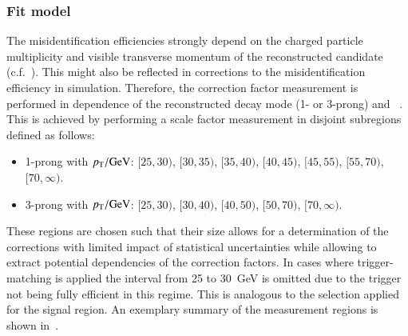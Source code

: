 


\subsubsection{Fit model}

The \jettotauhadvis misidentification efficiencies strongly depend on
the charged particle multiplicity and visible transverse momentum of
the reconstructed \tauhadvis candidate (c.f.\ ). This
might also be reflected in corrections to the \jettotauhadvis
misidentification efficiency in simulation. Therefore, the correction
factor measurement is performed in dependence of the reconstructed
decay mode (1- or 3-prong) and \tauhadvis~\pT. This is achieved by
performing a scale factor measurement in disjoint subregions defined
as follows:
\begin{itemize}

\item 1-prong \tauhadvis with $\pT / \si{\GeV}$: $[25, 30)$, $[30, 35)$,
  $[35, 40)$, $[40, 45)$, $[45, 55)$, $[55, 70)$, $[70, \infty)$.

\item 3-prong \tauhadvis with $\pT / \si{\GeV}$: $[25, 30)$, $[30, 40)$,
  $[40, 50)$, $[50, 70)$, $[70, \infty)$.

\end{itemize}
These regions are chosen such that their size allows for a
determination of the corrections with limited impact of statistical
uncertainties while allowing to extract potential \pT dependencies of
the correction factors. In cases where trigger-matching is applied the
\tauhadvis \pT interval from 25 to \SI{30}{\GeV} is omitted due to the
trigger not being fully efficient in this regime. This is analogous to
the selection applied for the \hadhad signal region. An exemplary
summary of the measurement regions is shown
in~.

